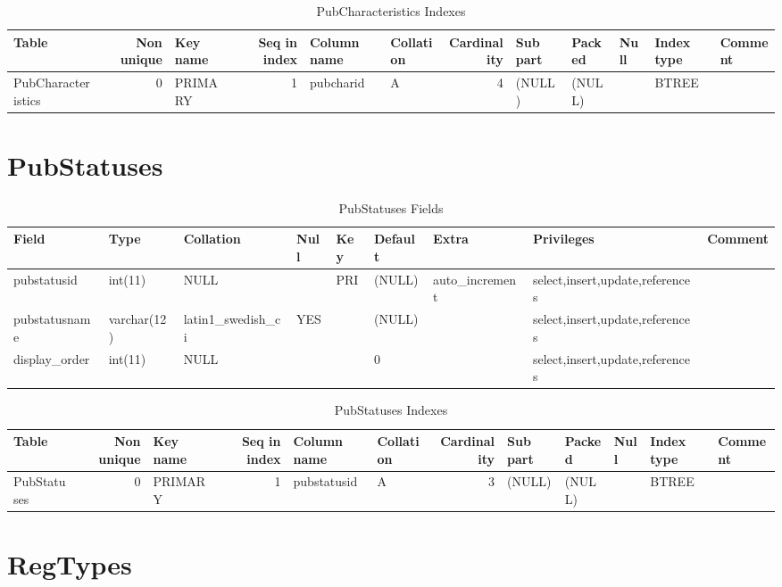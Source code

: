 \documentclass[captions=tablesignature]{scrartcl}
\begin{document}
\begin{table}[htb]
\caption{\label{tbl:pubcharacteristicsindexes}PubCharacteristics Indexes}
\centering
\begin{tabular}{lrlrllrlllll}
\hline
Table & Non unique & Key name & Seq in index & Column name & Collation & Cardinality & Sub part & Packed & Null & Index type & Comment\\
\hline
PubCharacteristics & 0 & PRIMARY & 1 & pubcharid & A & 4 & (NULL) & (NULL) &  & BTREE & \\
\hline
\end{tabular}
\end{table}
\section{PubStatuses}
\label{sec-18}

\begin{table}[htb]
\caption{\label{tbl:pubsttausesfields}PubStatuses Fields}
\centering
\begin{tabular}{lllllllll}
\hline
Field & Type & Collation & Null & Key & Default & Extra & Privileges & Comment\\
\hline
pubstatusid & int(11) & NULL &  & PRI & (NULL) & auto\_increment & select,insert,update,references & \\
pubstatusname & varchar(12) & latin1\_swedish\_ci & YES &  & (NULL) &  & select,insert,update,references & \\
display\_order & int(11) & NULL &  &  & 0 &  & select,insert,update,references & \\
\hline
\end{tabular}
\end{table}

\begin{table}[htb]
\caption{\label{tbl:pubstatusesindexes}PubStatuses Indexes}
\centering
\begin{tabular}{lrlrllrlllll}
\hline
Table & Non unique & Key name & Seq in index & Column name & Collation & Cardinality & Sub part & Packed & Null & Index type & Comment\\
\hline
PubStatuses & 0 & PRIMARY & 1 & pubstatusid & A & 3 & (NULL) & (NULL) &  & BTREE & \\
\hline
\end{tabular}
\end{table}
\section{RegTypes}
\label{sec-19}
\end{document}
